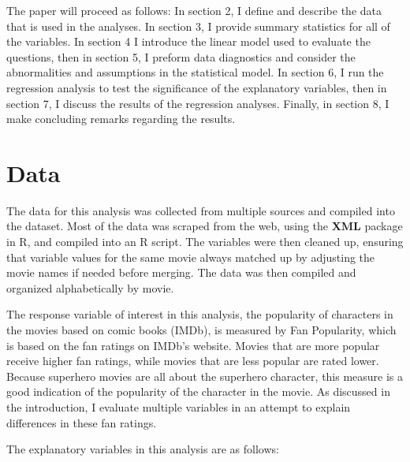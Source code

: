 \documentclass{svproc}
\begin{document}
The paper will proceed as follows: In section 2, I define and describe the data that is used in the analyses. In section 3, I provide summary statistics for all of the variables. In section 4 I introduce the linear model used to evaluate the questions, then in section 5, I preform data diagnostics and consider the abnormalities and assumptions in the statistical model. In section 6, I run the regression analysis to test the significance of the explanatory variables, then in section 7, I discuss the results of the regression analyses. Finally, in section 8, I make concluding remarks regarding the results. 

\section{Data}

The data for this analysis was collected from multiple sources and compiled into the dataset. Most of the data was scraped from the web, using the \textbf{XML} package in R, and compiled into an R script. The variables were then cleaned up, ensuring that variable values for the same movie always matched up by adjusting the movie names if needed before merging. The data was then compiled and organized alphabetically by movie. 

The response variable of interest in this analysis, the popularity of characters in the movies based on comic books (IMDb), is measured by Fan Popularity, which is based on the fan ratings on IMDb's website. Movies that are more popular receive higher fan ratings, while movies that are less popular are rated lower. Because superhero movies are all about the superhero character, this measure is a good indication of the popularity of the character in the movie. As discussed in the introduction, I evaluate multiple variables in an attempt to explain differences in these fan ratings.

The explanatory variables in this analysis are as follows:
\end{document}
